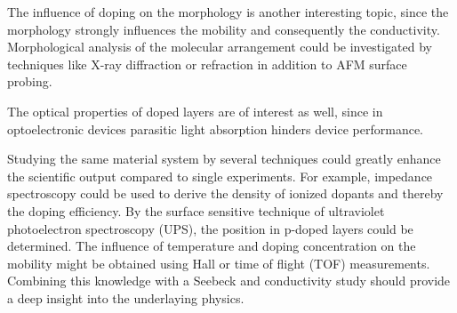 The influence of doping on the morphology is another interesting topic, since the morphology strongly influences the mobility and consequently the conductivity. Morphological analysis of the molecular arrangement could be investigated by techniques like X-ray diffraction or refraction in addition to AFM surface probing.

The optical properties of doped layers are of interest as well, since in optoelectronic devices parasitic light absorption hinders device performance.

Studying the same material system by several techniques could greatly enhance the scientific output compared to single experiments. For example, impedance spectroscopy could be used to derive the density of ionized dopants and thereby the doping efficiency. By the surface sensitive technique of ultraviolet photoelectron spectroscopy (UPS), the \EfLong position in p-doped layers could be determined.
The influence of temperature and doping concentration on the mobility might be obtained using Hall or time of flight (TOF) measurements.
Combining this knowledge with a Seebeck and conductivity study should provide a deep insight into the underlaying physics.

